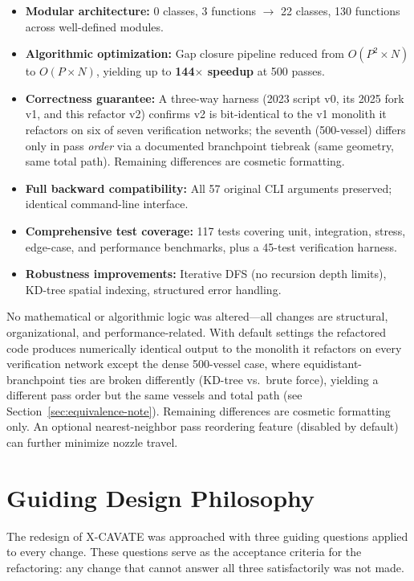 \documentclass[11pt,a4paper]{article}
\newcommand{\bigO}[1]{$O(#1)$}
\begin{document}
\begin{itemize}[leftmargin=2em]
    \item \textbf{Modular architecture:} 0 classes, 3 functions $\rightarrow$ 22 classes, 130 functions across well-defined modules.
    \item \textbf{Algorithmic optimization:} Gap closure pipeline reduced from \bigO{P^2 \times N} to \bigO{P \times N}, yielding up to \textbf{144$\times$ speedup} at 500 passes.
    \item \textbf{Correctness guarantee:} A three-way harness (2023 script v0, its 2025 fork v1, and this refactor v2) confirms v2 is bit-identical to the v1 monolith it refactors on six of seven verification networks; the seventh (500-vessel) differs only in pass \emph{order} via a documented branchpoint tiebreak (same geometry, same total path). Remaining differences are cosmetic formatting.
    \item \textbf{Full backward compatibility:} All 57 original CLI arguments preserved; identical command-line interface.
    \item \textbf{Comprehensive test coverage:} 117 tests covering unit, integration, stress, edge-case, and performance benchmarks, plus a 45-test verification harness.
    \item \textbf{Robustness improvements:} Iterative DFS (no recursion depth limits), KD-tree spatial indexing, structured error handling.
\end{itemize}

No mathematical or algorithmic logic was altered---all changes are structural, organizational, and performance-related. With default settings the refactored code produces numerically identical output to the monolith it refactors on every verification network except the dense 500-vessel case, where equidistant-branchpoint ties are broken differently (KD-tree vs.\ brute force), yielding a different pass order but the same vessels and total path (see Section~\ref{sec:equivalence-note}). Remaining differences are cosmetic formatting only. An optional nearest-neighbor pass reordering feature (disabled by default) can further minimize nozzle travel.

\section{Guiding Design Philosophy}

The redesign of X-CAVATE was approached with three guiding questions applied to every change. These questions serve as the acceptance criteria for the refactoring: any change that cannot answer all three satisfactorily was not made.
\end{document}
